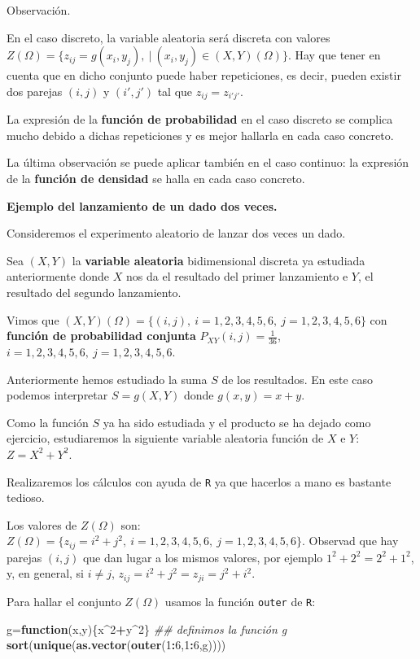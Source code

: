 \documentclass[]{book}
\newenvironment{Shaded}{\begin{snugshade}}{\end{snugshade}}
\newcommand{\CommentTok}[1]{\textcolor[rgb]{0.56,0.35,0.01}{\textit{#1}}}
\newcommand{\ControlFlowTok}[1]{\textcolor[rgb]{0.13,0.29,0.53}{\textbf{#1}}}
\newcommand{\DecValTok}[1]{\textcolor[rgb]{0.00,0.00,0.81}{#1}}
\newcommand{\KeywordTok}[1]{\textcolor[rgb]{0.13,0.29,0.53}{\textbf{#1}}}
\newcommand{\NormalTok}[1]{#1}
\newcommand{\OperatorTok}[1]{\textcolor[rgb]{0.81,0.36,0.00}{\textbf{#1}}}
\begin{document}
Observación.

En el caso discreto, la variable aleatoria será discreta con valores \(Z(\Omega)=\{z_{ij}=g(x_i,y_j),\ |\ (x_i,y_j)\in (X,Y)(\Omega)\}\).
Hay que tener en cuenta que en dicho conjunto puede haber repeticiones, es decir, pueden existir dos parejas \((i,j)\) y \((i',j')\) tal que \(z_{ij}=z_{i'j'}\).

La expresión de la \textbf{función de probabilidad} en el caso discreto se complica mucho debido a dichas repeticiones y es mejor hallarla en cada caso concreto.

La última observación se puede aplicar también en el caso continuo: la expresión de la \textbf{función de densidad} se halla en cada caso concreto.

\textbf{Ejemplo del lanzamiento de un dado dos veces.}

Consideremos el experimento aleatorio de lanzar dos veces un dado.

Sea \((X,Y)\) la \textbf{variable aleatoria} bidimensional discreta ya estudiada anteriormente donde \(X\) nos da el resultado del primer lanzamiento e \(Y\), el resultado del segundo lanzamiento.

Vimos que \((X,Y)(\Omega)=\{(i,j),\ i=1,2,3,4,5,6,\ j=1,2,3,4,5,6\}\) con \textbf{función de probabilidad conjunta} \(P_{XY}(i,j)=\frac{1}{36}\), \(i=1,2,3,4,5,6,\ j=1,2,3,4,5,6.\)

Anteriormente hemos estudiado la suma \(S\) de los resultados. En este caso podemos interpretar \(S=g(X,Y)\) donde \(g(x,y)=x+y\).

Como la función \(S\) ya ha sido estudiada y el producto se ha dejado como ejercicio, estudiaremos la siguiente variable aleatoria función de \(X\) e \(Y\): \(Z=X^2+Y^2\).

Realizaremos los cálculos con ayuda de \texttt{R} ya que hacerlos a mano es bastante tedioso.

Los valores de \(Z(\Omega)\) son: \(Z(\Omega)=\{z_{ij}=i^2+j^2,\ i=1,2,3,4,5,6,\ j=1,2,3,4,5,6\}\). Observad que hay parejas \((i,j)\) que dan lugar a los mismos valores, por ejemplo \(1^2+2^2 = 2^2+1^2\), y, en general, si \(i\neq j\), \(z_{ij}=i^2+j^2=z_{ji}=j^2+i^2\).

Para hallar el conjunto \(Z(\Omega)\) usamos la función \texttt{outer} de \texttt{R}:

\begin{Shaded}
\begin{Highlighting}[]
\NormalTok{g=}\ControlFlowTok{function}\NormalTok{(x,y)\{x}\OperatorTok{^}\DecValTok{2}\OperatorTok{+}\NormalTok{y}\OperatorTok{^}\DecValTok{2}\NormalTok{\}  }\CommentTok{## definimos la función g}
\KeywordTok{sort}\NormalTok{(}\KeywordTok{unique}\NormalTok{(}\KeywordTok{as.vector}\NormalTok{(}\KeywordTok{outer}\NormalTok{(}\DecValTok{1}\OperatorTok{:}\DecValTok{6}\NormalTok{,}\DecValTok{1}\OperatorTok{:}\DecValTok{6}\NormalTok{,g))))}
\end{Highlighting}
\end{Shaded}
\end{document}
